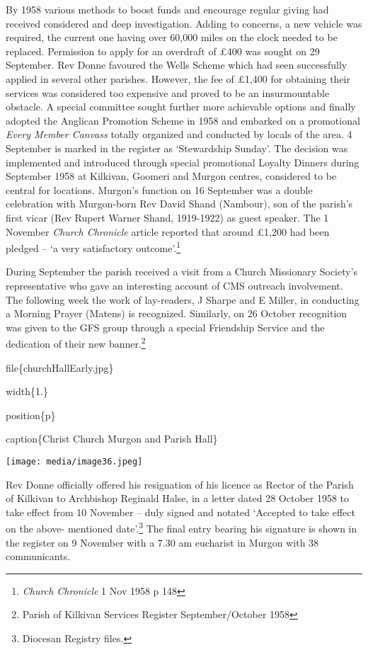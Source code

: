 By 1958 various methods to boost funds and encourage regular giving had received considered and deep investigation. Adding to concerns, a new vehicle was required, the current one having over 60,000 miles on the clock needed to be replaced. Permission to apply for an overdraft of £400 was sought on 29 September. Rev Donne favoured the Wells Scheme which had seen successfully applied in several other parishes. However, the fee of £1,400 for obtaining their services was considered too expensive and proved to be an insurmountable obstacle. A special committee sought further more achievable options and finally adopted the Anglican Promotion Scheme in 1958 and embarked on a promotional \emph{Every Member Canvass} totally organized and conducted by locals of the area. 4 September is marked in the register as `Stewardship Sunday'. The decision was implemented and introduced through special promotional Loyalty Dinners during September 1958 at Kilkivan, Goomeri and Murgon centres, considered to be central for locations. Murgon's function on 16 September was a double celebration with Murgon-born Rev David Shand (Nambour), son of the parish's first vicar (Rev Rupert Warner Shand, 1919-1922) as guest speaker. The 1 November \emph{Church Chronicle} article reported that around £1,200 had been pledged -- `a very satisfactory outcome'.\footnote{\emph{Church Chronicle} 1 Nov 1958 p 148}

During September the parish received a visit from a Church Missionary Society's representative who gave an interesting account of CMS outreach involvement. The following week the work of lay-readers, J Sharpe and E Miller, in conducting a Morning Prayer (Matens) is recognized. Similarly, on 26 October recognition was given to the GFS group through a special Friendship Service and the dedication of their new banner.\footnote{Parish of Kilkivan Services Register September/October 1958}

file\{churchHallEarly.jpg\}

width\{1.\}

position\{p\}

caption\{Christ Church Murgon and Parish Hall\}

\texttt{[image: media/image36.jpeg]}

Rev Donne officially offered his resignation of his licence as Rector of the Parish of Kilkivan to Archbishop Reginald Halse, in a letter dated 28 October 1958 to take effect from 10 November -- duly signed and notated `Accepted to take effect on the above- mentioned date'.\footnote{Diocesan Registry files.} The final entry bearing his signature is shown in the register on 9 November with a 7.30 am eucharist in Murgon with 38 communicants.

